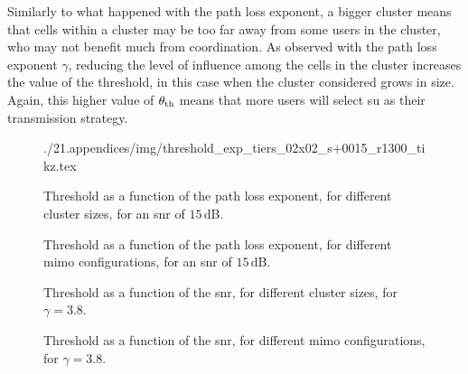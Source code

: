 Similarly to what happened with the path loss exponent, a bigger cluster means
that cells within a cluster may be too far away from some users in the cluster,
who may not benefit much from coordination. As observed with the path loss
exponent $\gamma$, reducing the level of influence among the cells in the
cluster increases the value of the threshold, in this case when the cluster
considered grows in size. Again, this higher value of $\theta_{\text{th}}$ means that more
users will select \gls{su} as their transmission strategy.

\begin{figure}[t]
	\centering
    \begin{minipage}[t]{0.7\textwidth}
         {./21.appendices/img/threshold_exp_tiers_02x02_s+0015_r1300_tikz.tex}
    \end{minipage}
	\caption{Threshold as a function of the path loss exponent, for different
    cluster sizes, for an \gls{snr} of $15$\,dB.}
	\label{fig:th_exp_tiers}
\end{figure}

\begin{figure}[t]
	\centering
    \begin{minipage}[t]{0.7\textwidth}
        
    \end{minipage}
	\caption{Threshold as a function of the path loss exponent, for different
    \gls{mimo} configurations, for an \gls{snr} of $15$\,dB.}
	\label{fig:th_exp_ant}
\end{figure}

\begin{figure}[t]
	\centering
    \begin{minipage}[t]{0.7\textwidth}
        
    \end{minipage}
    \caption{Threshold as a function of the \gls{snr}, for different cluster
    sizes, for $\gamma = 3.8$.}
	\label{fig:th_snr_tiers}
\end{figure}

\begin{figure}[t]
	\centering
    \begin{minipage}[t]{0.7\textwidth}
        
    \end{minipage}
    \caption{Threshold as a function of the \gls{snr}, for different \gls{mimo}
    configurations, for $\gamma = 3.8$.}
	\label{fig:th_snr_ant}
\end{figure}

